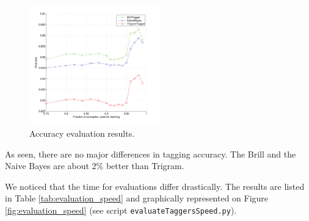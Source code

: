 \documentclass[10pt, conference, compsocconf]{IEEEtran}
\begin{document}
\begin{figure}[h]
\begin{center}
\includegraphics[width=0.5\textwidth]{../evaluation/graph.pdf} 
\end{center}
\caption{Accuracy evaluation results.}
\label{fig:evaluation}
\end{figure}
\par
As seen, there are no major differences in tagging accuracy. The Brill and the Naive Bayes are about 2\% better than Trigram.
\par
We noticed that the time for evaluations differ drastically.
The results are listed in Table \ref{tab:evaluation_speed} and graphically represented on Figure \ref{fig:evaluation_speed} (see script \texttt{evaluateTaggersSpeed.py}).
\end{document}
